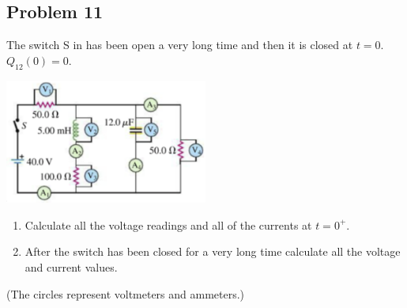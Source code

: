 \subsection*{Problem 11}
The switch S in has been open a very long time and then it is closed at $t=0$. $Q_12 (0) = 0$.\\
\centerline{\includegraphics[width=0.5\textwidth]{Images/P11img1.png}}
\begin{enumerate}
    \item Calculate all the voltage readings and all of the currents at $t=0^+$.
    \item After the switch has been closed for a very long time calculate all the voltage and current values.
\end{enumerate}
(The circles represent voltmeters and ammeters.)

